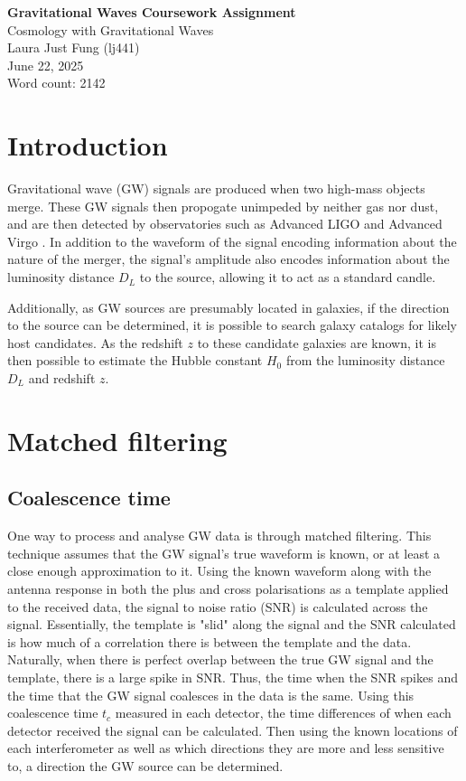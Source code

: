 \documentclass[11pt,a4paper]{article}
\begin{document}
 

\begin{center}
    \LARGE{\textbf{Gravitational Waves Coursework Assignment}}
    \\
    \Large{{Cosmology with Gravitational Waves}}
    \\
    \large{Laura Just Fung (lj441)}
    \\
    June 22, 2025
    \\
    Word count: 2142
\end{center}
\section{Introduction}
\label{sec:intro}
Gravitational wave (GW) signals are produced when two high-mass objects merge. These GW signals then propogate unimpeded by neither gas nor dust, and are then detected by observatories such as Advanced LIGO \citep{LIGO2015} and Advanced Virgo \citep{Acernese_2014}. In addition to the waveform of the signal encoding information about the nature of the merger, the signal's amplitude also encodes information about the luminosity distance $D_L$ to the source, allowing it to act as a standard candle.

Additionally, as GW sources are presumably located in galaxies, if the direction to the source can be determined, it is possible to search galaxy catalogs for likely host candidates. As the redshift $z$ to these candidate galaxies are known, it is then possible to estimate the Hubble constant $H_0$ from the luminosity distance $D_L$ and redshift $z$.

\section{Matched filtering}
\label{sec:matched_filtering}
\subsection{Coalescence time}
\label{sec:tc}
One way to process and analyse GW data is through matched filtering. This technique assumes that the GW signal's true waveform is known, or at least a close enough approximation to it. Using the known waveform along with the antenna response in both the plus and cross polarisations as a template applied to the received data, the signal to noise ratio (SNR) is calculated across the signal. Essentially, the template is "slid" along the signal and the SNR calculated is how much of a correlation there is between the template and the data. Naturally, when there is perfect overlap between the true GW signal and the template, there is a large spike in SNR. Thus, the time when the SNR spikes and the time that the GW signal coalesces in the data is the same. Using this coalescence time $t_c$ measured in each detector, the time differences of when each detector received the signal can be calculated. Then using the known locations of each interferometer as well as which directions they are more and less sensitive to, a direction the GW source can be determined. 
\end{document}

